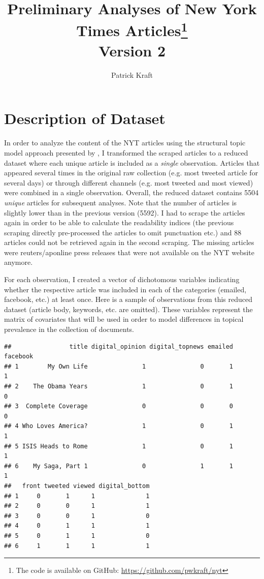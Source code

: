 \documentclass[12pt]{article}\usepackage[]{graphicx}\usepackage[]{color}
\title{Preliminary Analyses of New York Times Articles\footnote{The code is available on GitHub: \url{https://github.com/pwkraft/nyt}}\\\large{Version 2}}
\author{Patrick Kraft}
\makeatletter
\newenvironment{kframe}{%
 \def\at@end@of@kframe{}%
 \ifinner\ifhmode%
  \def\at@end@of@kframe{\end{minipage}}%
  \begin{minipage}{\columnwidth}%
 \fi\fi%
 \def\FrameCommand##1{\hskip\@totalleftmargin \hskip-\fboxsep
 \colorbox{shadecolor}{##1}\hskip-\fboxsep
     \hskip-\linewidth \hskip-\@totalleftmargin \hskip\columnwidth}%
 \MakeFramed {\advance\hsize-\width
   \@totalleftmargin\z@ \linewidth\hsize
   \@setminipage}}%
 {\par\unskip\endMakeFramed%
 \at@end@of@kframe}
\newenvironment{knitrout}{}{} %
\makeatother
\begin{document}
\maketitle




\section{Description of Dataset}

In order to analyze the content of the NYT articles using the structural topic model approach presented by \citet{roberts2014structural}, I transformed the scraped articles to a reduced dataset where each unique article is included as a \textit{single} observation. Articles that appeared several times in the original raw collection (e.g. most tweeted article for several days) or through different channels (e.g. most tweeted and most viewed) were combined in a single observation. Overall, the reduced dataset contains 5504 \textit{unique} articles for subsequent analyses. Note that the number of articles is slightly lower than in the previous version (5592). I had to scrape the articles again in order to be able to calculate the readability indices (the previous scraping directly pre-processed the articles to omit punctuation etc.) and 88 articles could not be retrieved again in the second scraping. The missing articles were reuters/aponline press releases that were not available on the NYT website anymore.

For each observation, I created a vector of dichotomous variables indicating whether the respective article was included in each of the categories (emailed, facebook, etc.) at least once. Here is a sample of observations from this reduced dataset (article body, keywords, etc. are omitted). These variables represent the matrix of covariates that will be used in order to model differences in topical prevalence in the collection of documents.

\begin{knitrout}
\color{fgcolor}\begin{kframe}
\begin{verbatim}
##                title digital_opinion digital_topnews emailed facebook
## 1        My Own Life               1               0       1        1
## 2    The Obama Years               1               0       1        0
## 3  Complete Coverage               0               0       0        0
## 4 Who Loves America?               1               0       1        1
## 5 ISIS Heads to Rome               1               0       1        1
## 6    My Saga, Part 1               0               1       1        1
##   front tweeted viewed digital_bottom
## 1     0       1      1              1
## 2     0       0      1              1
## 3     0       0      1              0
## 4     0       1      1              1
## 5     0       1      1              0
## 6     1       1      1              1
\end{verbatim}
\end{kframe}
\end{knitrout}
\end{document}

